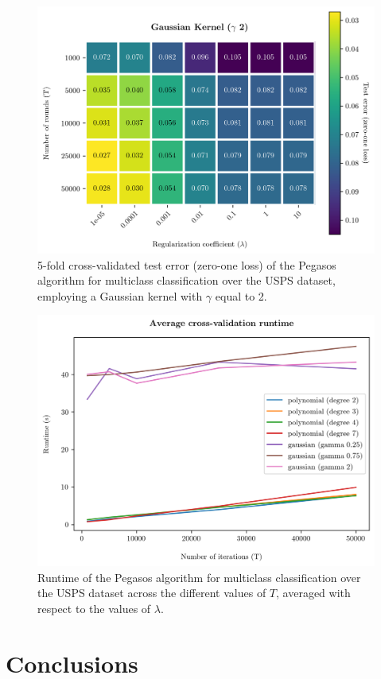 \documentclass[runningheads]{llncs}
\begin{document}
\begin{figure}
  \center
  \includegraphics[width=0.8\linewidth]{../img/gaussian_2_error.png}
  \caption{5-fold cross-validated test error (zero-one loss) of the Pegasos algorithm for multiclass classification over the USPS dataset, employing a Gaussian kernel with $\gamma$ equal to 2.} 
  \label{fig:experiments:gaussian_2}
\end{figure}

\begin{figure}
  \center
  \includegraphics[width=0.8\linewidth]{../img/cv_runtime.png}
  \caption{Runtime of the Pegasos algorithm for multiclass classification over the USPS dataset across the different values of $T$, averaged with respect to the values of $\lambda$.} 
  \label{fig:experiments:cv_runtime}
\end{figure}

\section{Conclusions}
\label{sec:conclusions}
\end{document}
